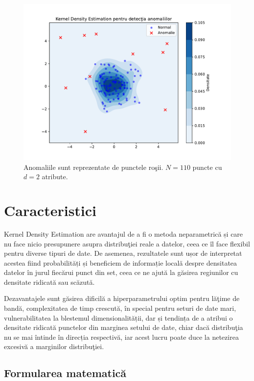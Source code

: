 \begin{figure}[H]
    \centering
    \includegraphics[width=\linewidth]{images/kde_anomalies.pdf}
    \caption{Anomaliile sunt reprezentate de punctele roşii.
    $N=110$ puncte cu $d=2$ atribute.}
\end{figure}

\section{Caracteristici}

Kernel Density Estimation are avantajul de a fi o metoda 
neparametrică și care nu face nicio presupunere asupra 
distribuţiei reale a datelor, ceea ce îl face flexibil 
pentru diverse tipuri de date. De asemenea, rezultatele 
sunt ușor de interpretat acestea fiind probabilități și 
beneficiem de informație locală despre
densitatea datelor în jurul fiecărui punct 
din set, ceea ce ne ajută la găsirea regiunilor cu densitate ridicată 
sau scăzută.

Dezavantajele sunt găsirea dificilă a hiperparametrului 
optim pentru 
lăţime de bandă, complexitatea de timp crescută, în special 
pentru seturi de date mari, vulnerabilitatea la blestemul 
dimensionalității, dar și tendința de a atribui o densitate 
ridicată punctelor din marginea setului de date, chiar 
dacă distribuţia nu se mai întinde în direcția respectivă, 
iar acest lucru poate duce la netezirea excesivă a marginilor 
distribuţiei.

\subsection{Formularea matematică}

